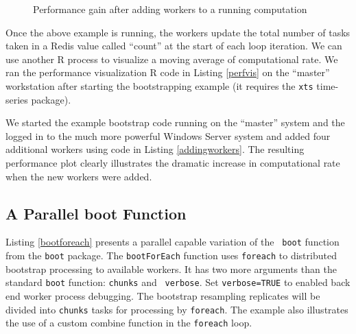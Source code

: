 \documentclass[12pt]{article}
\begin{document}
\begin{figure}[!ht]
\begin{center}
\end{center}
\caption{Performance gain after adding workers to a running computation}
\end{figure}


Once the above example is running, the workers update the total number of tasks
taken in a Redis value called ``count'' at the start of each loop iteration. We
can use another R process to visualize a moving average of computational rate.
We ran the performance visualization R code in Listing \ref{perfvis}
on the ``master'' workstation after starting
the bootstrapping example (it requires the {\tt xts} time-series package).

We started the example bootstrap code running on the ``master'' system and the
logged in to the much more powerful Windows Server system and added four
additional workers using code in Listing \ref{addingworkers}. The resulting
performance plot clearly illustrates the dramatic increase in computational
rate when the new workers were added.

\subsection{A Parallel boot Function}

Listing \ref{bootforeach} presents a parallel capable variation of the {\tt
boot} function from the {\tt boot} package. The {\tt bootForEach} function uses
{\tt foreach} to distributed bootstrap processing to available workers. It has
two more arguments than the standard {\tt boot} function: {\tt chunks} and {\tt
verbose}. Set {\tt verbose=TRUE} to enabled back end worker process debugging.
The bootstrap resampling replicates will be divided into {\tt chunks} tasks for
processing by {\tt foreach}.  The example also illustrates the use of a custom
combine function in the {\tt foreach} loop.
\end{document}
